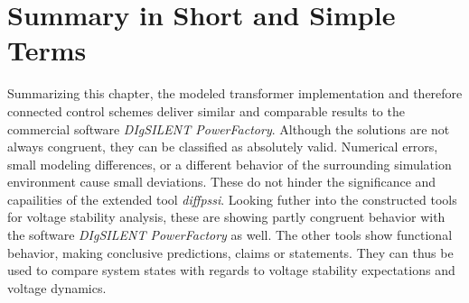 
\section{Summary in Short and Simple Terms}

Summarizing this chapter, the modeled transformer implementation and therefore connected control schemes deliver similar and comparable results to the commercial software \textit{DIgSILENT PowerFactory}.
Although the solutions are not always congruent, they can be classified as absolutely valid.
Numerical errors, small modeling differences, or a different behavior of the surrounding simulation environment cause small deviations.
These do not hinder the significance and capailities of the extended tool \textit{diffpssi}.
Looking futher into the constructed tools for voltage stability analysis, these are showing partly congruent behavior with the software \textit{DIgSILENT PowerFactory} as well.
The other tools show functional behavior, making conclusive predictions, claims or statements.
They can thus be used to compare system states with regards to voltage stability expectations and voltage dynamics.